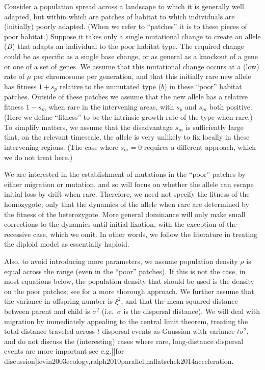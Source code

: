 \documentclass{article}
\newcommand{\citep}[1]{\cite{#1}}
\newcommand{\citet}[1]{\cite{#1}}
\newcommand{\gc}[1]{{\it\color{green}(#1)} }
\newcommand{\plr}[1]{{\it\color{blue}(#1)}}
\begin{document}
Consider a population spread across a landscape to which it is generally well adapted,
but within which are patches of habitat to which individuals are (initially) poorly adapted.
(When we refer to ``patches'' it is to these pieces of poor habitat.)
Suppose it takes only a single mutational change to create an allele
($B$) that adapts an individual to the poor habitat type.
The required change could be as specific as a single base change, 
or as general as a knockout of a gene or one of a set of genes.
We assume that this mutational change occurs at a (low) rate of $\mu$ per chromosome per generation,
and that this initially rare new allele has fitness $1+s_p$ relative to the unmutated type ($b$) in these ``poor'' habitat patches.
Outside of these patches we assume that the new allele has a relative fitness
$1-s_m$  when rare in the intervening areas, with $s_p$ and $s_m$ both positive.
(Here we define ``fitness'' to be the intrinsic growth rate of the type when rare.)
To simplify matters, we assume that the disadvantage $s_m$ 
is sufficiently large that, on the relevant timescale,
the allele is very unlikely to fix locally in these intervening regions.
(The case where $s_m=0$ requires a different approach, which we do not treat here.)

We are interested in the establishment of mutations in the ``poor'' patches by either
migration or mutation, and so will focus on whether the allele
can escape initial loss by drift when rare. 
Therefore, we need not specify the fitness of the homozygote; 
only that the dynamics of the allele when rare 
are determined by the fitness of the heterozygote. 
More general dominance will only make small corrections to the dynamics until initial fixation,
with the exception of the recessive case, which we omit.
In other words,
we follow the literature in treating the diploid model as essentially haploid.

Also, to avoid introducing more parameters,
we assume population density $\rho$ is equal across the range (even in the ``poor'' patches).
If this is not the case, in most equations below, the population density that should be used is the density
on the poor patches; see \citet{lenormand2002limits} for a more thorough approach.
We further assume that the variance in offspring number is $\xi^2$, 
and that the mean squared distance between parent and child is $\sigma^2$
(i.e.\ $\sigma$ is the dispersal distance). 
We will deal with migration by immediately appealing to the central limit theorem,
treating the total distance traveled across $t$  dispersal events as Gaussian with variance $t \sigma^2$,
and do not discuss the (interesting) cases where rare, long-distance dispersal events
are more important \citep[see e.g.][for discussion]{levin2003ecology,ralph2010parallel,hallatschek2014acceleration}.  
\end{document}
